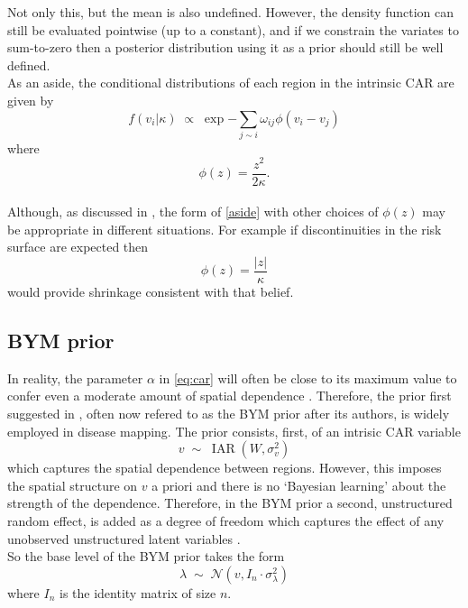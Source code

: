 \documentclass[11pt]{report}
\begin{document}
Not only this, but the mean is also undefined. However, the density function can still be evaluated pointwise (up to a constant), and if we constrain the variates to sum-to-zero then a posterior distribution using it as a prior should still be well defined. \\

As an aside, the conditional distributions of each region in the intrinsic CAR are given by
\begin{equation} \label{aside}
f(v_i | \kappa) \; \propto \; \exp{- \sum_{j \sim i} \omega_{ij} \phi(v_i - v_j)}
\end{equation}
where
\begin{equation*}
\phi(z) = \frac{z^2}{2\kappa}.
\end{equation*} \\

Although, as discussed in \citet{bym}, the form of \ref{aside} with other choices of $\phi(z)$ may be appropriate in different situations. For example if discontinuities in the risk surface are expected then
\begin{equation*}
\phi(z) = \frac{|z|}{\kappa}
\end{equation*}
would provide shrinkage consistent with that belief.

\subsection{BYM prior} \label{bym}

In reality, the parameter $\alpha$ in \ref{eq:car} will often be close to its maximum value to confer even a moderate amount of spatial dependence \citep{bugs}. Therefore, the prior first suggested in \citet*{bym}, often now refered to as the BYM prior after its authors, is widely employed in disease mapping. The prior consists, first, of an intrisic CAR variable
\begin{equation*}
v \; \sim \; \operatorname{IAR}(W, \sigma_v^2)
\end{equation*}
which captures the spatial dependence between regions. However, this imposes the spatial structure on $v$ a priori and there is no `Bayesian learning' about the strength of the dependence. Therefore, in the BYM prior a second, unstructured random effect, is added as a degree of freedom which captures the effect of any unobserved unstructured latent variables \citep{bugs}. \\

So the base level of the BYM prior takes the form
\begin{equation}
\lambda \; \sim \; \mathcal{N}(v, I_n \cdot \sigma_{\lambda}^2)
\end{equation}
where $I_n$ is the identity matrix of size $n$. \\
\end{document}
